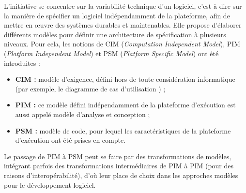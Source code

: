 L'initiative {\mda} se concentre sur la variabilité technique d'un logiciel,
c'est-à-dire sur la manière de spécifier un logiciel indépendamment de la
plateforme, afin de mettre en œuvre des systèmes durables et maintenables. Elle
propose d'élaborer différents modèles pour définir une architecture de
spécification à plusieurs niveaux. Pour cela, les notions de CIM
(\emph{Computation Independent Model}), PIM (\emph{Platform Independent Model})
et PSM (\emph{Platform Specific Model}) ont été introduites :
\begin{itemize}
  \item \textbf{CIM :} modèle d'exigence, défini hors de toute
  considération informatique (par exemple, le diagramme de cas d'utilisation
  {\uml}) ;
  \item \textbf{PIM :} ce modèle défini indépendamment de la plateforme
  d'exécution est aussi appelé modèle d'analyse et conception ;
  \item \textbf{PSM :} modèle de code, pour lequel les
  caractéristiques de la plateforme d'exécution ont été prises en compte.
\end{itemize}

Le passage de PIM à PSM peut se faire par des transformations de modèles,
intégrant parfois des transformations intermédiaires de PIM à PIM (pour des
raisons d'interopérabilité), d'où leur place de choix dans les approches
modèles pour le développement logiciel.




